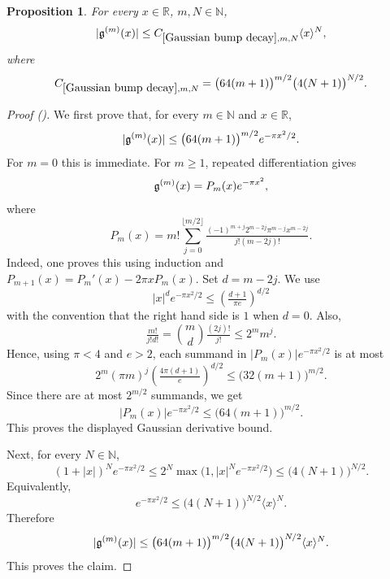 \documentclass[12pt,reqno]{amsart}
\newcommand{\auto}{{({\tiny\faCar})}}
\theoremstyle{plain}
\newtheorem{proposition}[theorem]{Proposition}
\numberwithin{equation}{section}
\theoremstyle{remark}
\newcommand{\uses}[1]{}
\newcommand{\usesdefs}[1]{}
\newcommand{\R}{{\mathbb R}}
\newcommand{\N}{{\mathbb N}}
\begin{document}
\begin{proposition}\label{Gaussian bump decay}\uses{}\usesdefs{gaussian,bracket bump}
For every $x\in\R$, $m,N\in\N$,
\begin{equation}\label{auto:Gaussian-derivative-decay} |\mathfrak{g}^{(m)}(x)|\le C_{\ref{Gaussian bump decay},m,N} \langle x\rangle^N, \end{equation}
where
\begin{equation}\label{auto:Gaussian-bump-decay-constant}
C_{\ref{Gaussian bump decay},m,N}
=\bigl(64(m+1)\bigr)^{m/2}\bigl(4(N+1)\bigr)^{N/2}.
\end{equation}

\end{proposition}
\begin{proof}[Proof \auto]
We first prove that, for every $m\in\N$ and $x\in\R$,
\[
|\mathfrak{g}^{(m)}(x)|
\le
\bigl(64(m+1)\bigr)^{m/2}e^{-\pi x^2/2}.
\]
For $m=0$ this is immediate. For $m\ge 1$, repeated differentiation gives
\[
\mathfrak{g}^{(m)}(x)=P_m(x)e^{-\pi x^2},
\]
where
\[
P_m(x)
=
m!\sum_{j=0}^{\lfloor m/2\rfloor}
\tfrac{(-1)^{m+j}2^{m-2j}\pi^{m-j}x^{m-2j}}
{j!(m-2j)!}.
\]
Indeed, one proves this using induction and
$P_{m+1}(x)=P_m'(x)-2\pi xP_m(x).$
Set $d=m-2j$. We use
\[
|x|^d e^{-\pi x^2/2}
\le
\left(\tfrac{d+1}{\pi e}\right)^{d/2}
\]
with the convention that the right hand side is $1$ when $d=0$.
Also,
\[
\tfrac{m!}{j!d!}
=
\binom{m}{d}\tfrac{(2j)!}{j!}
\le
2^m m^j .
\]
Hence, using $\pi<4$ and $e>2$, each summand in $|P_m(x)|e^{-\pi x^2/2}$ is at most
\[
2^m(\pi m)^j
\left(\tfrac{4\pi(d+1)}{e}\right)^{d/2}
\le
\bigl(32(m+1)\bigr)^{m/2}.
\]
Since there are at most $2^{m/2}$ summands, we get
\[
|P_m(x)|e^{-\pi x^2/2}
\le
\bigl(64(m+1)\bigr)^{m/2}.
\]
This proves the displayed Gaussian derivative bound.

Next, for every $N\in\N$,
\[
(1+|x|)^N e^{-\pi x^2/2}
\le
2^N\max\bigl(1,|x|^Ne^{-\pi x^2/2}\bigr)
\le
\bigl(4(N+1)\bigr)^{N/2}.
\]
Equivalently,
\[
e^{-\pi x^2/2}
\le
\bigl(4(N+1)\bigr)^{N/2}\langle x\rangle^N .
\]
Therefore
\[
|\mathfrak{g}^{(m)}(x)|
\le
\bigl(64(m+1)\bigr)^{m/2}
\bigl(4(N+1)\bigr)^{N/2}
\langle x\rangle^N.
\]
This proves the claim.
\end{proof}
\end{document}
